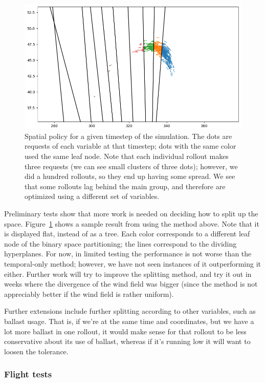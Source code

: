 \documentclass[11pt]{scrartcl} %
\begin{document}
\begin{figure}
\includegraphics[width=0.8\linewidth]{sp3.png}
\caption{Spatial policy for a given timestep of the simulation. The dots are requests of each variable at that timestep; dots with the same color used the same leaf node. Note that each individual rollout makes three requests (we can see small clusters of three dots); however, we did a hundred rollouts, so they end up having some spread. We see that some rollouts lag behind the main group, and therefore are optimized using a different set of variables.}
\label{spatial}
\end{figure}

Preliminary tests show that more work is needed on deciding how to split up the space. Figure~\ref{spatial} shows a sample result from using the method above. Note that it is displayed flat, instead of as a tree. Each color corresponds to a different leaf node of the binary space partitioning; the lines correspond to the dividing hyperplanes. For now, in limited testing the performance is not worse than the temporal-only method; however, we have not seen instances of it outperforming it either. Further work will try to improve the splitting method, and try it out in weeks where the divergence of the wind field was bigger (since the method is not appreciably better if the wind field is rather uniform).

Further extensions include further splitting according to other variables, such as ballast usage. That is, if we're at the same time and coordinates, but we have a lot more ballast in one rollout, it would make sense for that rollout to be less conservative about its use of ballast, whereas if it's running low it will want to loosen the tolerance.

\subsubsection{Flight tests}
\end{document}
